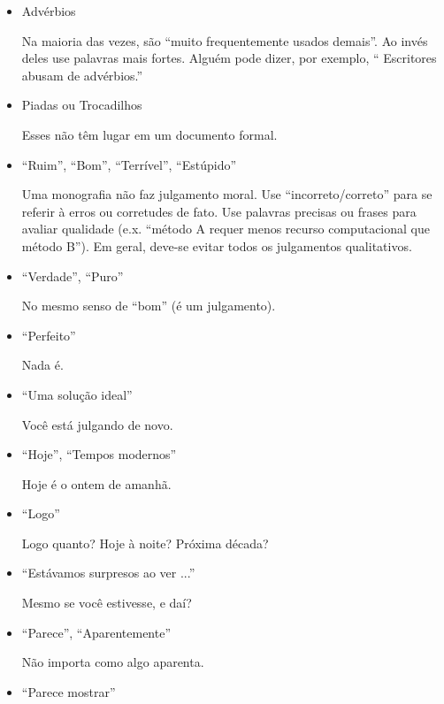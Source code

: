 \begin{itemize}

	\item Adv\'{e}rbios

		\indent Na maioria das vezes, s\~{a}o ``muito frequentemente usados demais''. Ao inv\'{e}s deles use palavras mais fortes. Algu\'{e}m pode dizer, por exemplo, `` Escritores abusam de adv\'{e}rbios.''
	
	\item Piadas ou Trocadilhos

		\indent Esses n\~{a}o têm lugar em um documento formal.
	
	\item ``Ruim'', ``Bom'', ``Terr\'{i}vel'', ``Est\'{u}pido''

		\indent Uma monografia n\~{a}o faz julgamento moral. Use ``incorreto/correto'' para se referir à erros ou corretudes de fato.
		Use palavras precisas ou frases para avaliar qualidade (e.x. ``m\'{e}todo A requer menos recurso computacional que m\'{e}todo B''). Em geral, deve-se evitar todos os julgamentos qualitativos.
		
	\item ``Verdade'', ``Puro''

		\indent No mesmo senso de ``bom'' (\'{e} um julgamento).
		
	\item ``Perfeito''

		\indent Nada \'{e}.
		
	\item ``Uma solu\c{c}\~{a}o ideal''

		\indent Você est\'{a} julgando de novo.
		
	\item ``Hoje'', ``Tempos modernos''

		\indent Hoje \'{e} o ontem de amanh\~{a}.
		
	\item ``Logo''

		\indent Logo quanto? Hoje à noite? Pr\'{o}xima d\'{e}cada?
		
	\item ``Est\'{a}vamos surpresos ao ver ...''

		\indent Mesmo se você estivesse, e da\'{i}?
		
	\item ``Parece'', ``Aparentemente''

		\indent N\~{a}o importa como algo aparenta.
	
	\item ``Parece mostrar''


\end{itemize}
